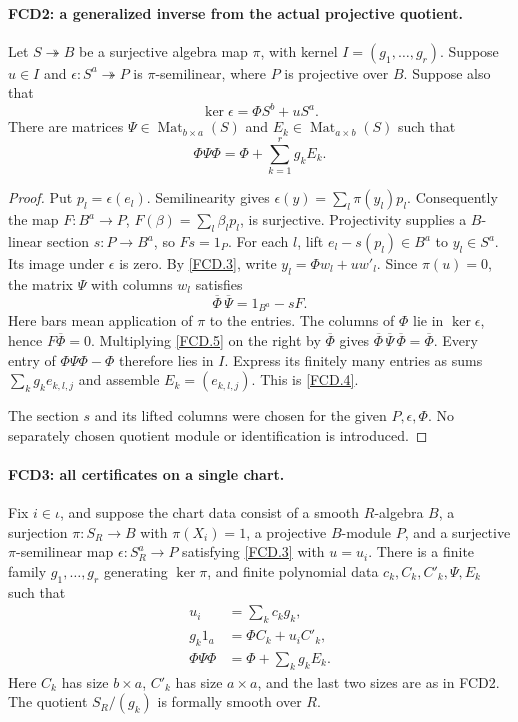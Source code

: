 \documentclass[11pt,a4paper]{article}
\numberwithin{equation}{section}
\theoremstyle{remark}\newtheorem{remark}[theorem]{Remark}
\begin{document}
\paragraph{FCD2: a generalized inverse from the actual projective quotient.}
\label{claim:FCD2}
Let $S\twoheadrightarrow B$ be a surjective algebra map $\pi$,
with kernel $I=(g_1,\ldots,g_r)$.  Suppose $u\in I$ and
$\epsilon:S^a\twoheadrightarrow P$ is $\pi$-semilinear, where
$P$ is projective over $B$.  Suppose also that
\[
 \ker\epsilon=\Phi S^b+uS^a.                          \tag{FCD.3}\label{FCD.3}
\]
There are matrices $\Psi\in\operatorname{Mat}_{b\times a}(S)$
and $E_k\in\operatorname{Mat}_{a\times b}(S)$ such that
\[
 \Phi\Psi\Phi=\Phi+\sum_{k=1}^r g_kE_k.              \tag{FCD.4}\label{FCD.4}
\]

\begin{proof}
Put $p_l=\epsilon(e_l)$.  Semilinearity gives
$\epsilon(y)=\sum_l\pi(y_l)p_l$.  Consequently the map
$F:B^a\to P$, $F(\beta)=\sum_l\beta_lp_l$, is surjective.
Projectivity supplies a $B$-linear section $s:P\to B^a$, so
$Fs=1_P$.  For each $l$, lift $e_l-s(p_l)\in B^a$ to
$y_l\in S^a$.  Its image under $\epsilon$ is zero.  By
\eqref{FCD.3}, write $y_l=\Phi w_l+u w'_l$.  Since $\pi(u)=0$,
the matrix $\Psi$ with columns $w_l$ satisfies
\[
 \overline\Phi\,\overline\Psi=1_{B^a}-sF.           \tag{FCD.5}\label{FCD.5}
\]
Here bars mean application of $\pi$ to the entries.  The columns
of $\Phi$ lie in $\ker\epsilon$, hence $F\overline\Phi=0$.
Multiplying \eqref{FCD.5} on the right by $\overline\Phi$ gives
$\overline\Phi\,\overline\Psi\,\overline\Phi
=\overline\Phi$.  Every entry of
$\Phi\Psi\Phi-\Phi$ therefore lies in $I$.
Express its finitely many entries as sums $\sum_k g_k e_{k,l,j}$
and assemble $E_k=(e_{k,l,j})$.  This is \eqref{FCD.4}.

The section $s$ and its lifted columns were chosen for the given
$P,\epsilon,\Phi$.  No separately chosen quotient module or
identification is introduced.
\end{proof}

\paragraph{FCD3: all certificates on a single chart.}
\label{claim:FCD3}
Fix $i\in\iota$, and suppose the chart data consist of a smooth
$R$-algebra $B$, a surjection $\pi:S_R\to B$ with
$\pi(X_i)=1$, a projective $B$-module $P$, and a surjective
$\pi$-semilinear map $\epsilon:S_R^a\to P$ satisfying
\eqref{FCD.3} with $u=u_i$.
There is a finite family $g_1,\ldots,g_r$ generating $\ker\pi$,
and finite polynomial data $c_k,C_k,C'_k,\Psi,E_k$ such that
\begin{align}
 u_i&=\sum_k c_kg_k,\nonumber\\
 g_k1_a&=\Phi C_k+u_iC'_k,\nonumber\\
 \Phi\Psi\Phi&=\Phi+\sum_k g_kE_k.                   \tag{FCD.6}\label{FCD.6}
\end{align}
Here $C_k$ has size $b\times a$, $C'_k$ has size $a\times a$,
and the last two sizes are as in FCD2.  The quotient $S_R/(g_k)$
is formally smooth over $R$.
\end{document}
